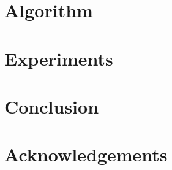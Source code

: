 \documentclass{article}
\begin{document}
\section{Algorithm}
\label{sec:algorithm}
\section{Experiments}
\label{sec:experiments}
\section{Conclusion}
\label{sec:conclusion}
\section*{Acknowledgements}







\appendix

\end{document}
